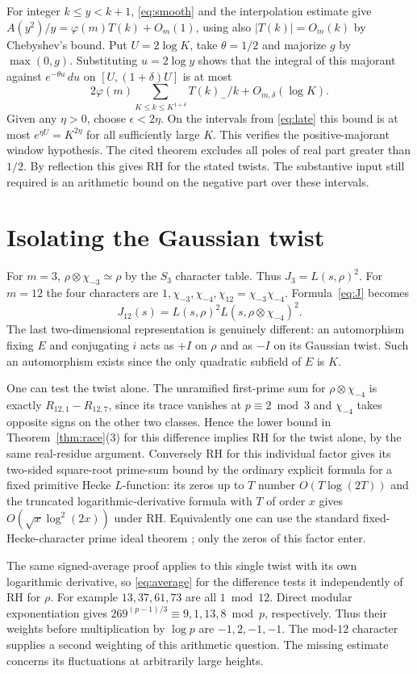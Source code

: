 \documentclass[11pt]{article}
\begin{document}
For integer $k\le y<k+1$, \eqref{eq:smooth} and the interpolation estimate give $A(y^2)/y=\varphi(m)T(k)+O_m(1)$, using also $|T(k)|=O_m(k)$ by Chebyshev's bound. Put $U=2\log K$, take $\theta=1/2$ and majorize $g$ by $\max(0,g)$. Substituting $u=2\log y$ shows that the integral of this majorant against $e^{-\theta u}\,du$ on $[U,(1+\delta)U]$ is at most
\[
 2\varphi(m)\sum_{K\le k\le K^{1+\delta}} T(k)_-/k+O_{m,\delta}(\log K).
\]
Given any $\eta>0$, choose $\epsilon<2\eta$. On the intervals from \eqref{eq:late} this bound is at most $e^{\eta U}=K^{2\eta}$ for all sufficiently large $K$. This verifies the positive-majorant window hypothesis. The cited theorem excludes all poles of real part greater than $1/2$. By reflection this gives RH for the stated twists. The substantive input still required is an arithmetic bound on the negative part over these intervals.

\section{Isolating the Gaussian twist}\label{sec:gauss}
For $m=3$, $\rho\otimes\chi_{-3}\simeq\rho$ by the $S_3$ character table. Thus $J_3=L(s,\rho)^2$. For $m=12$ the four characters are $1,\chi_{-3},\chi_{-4},\chi_{12}=\chi_{-3}\chi_{-4}$. Formula~\eqref{eq:J} becomes
\[
 J_{12}(s)=L(s,\rho)^2 L(s,\rho\otimes\chi_{-4})^2 .
\]
The last two-dimensional representation is genuinely different: an automorphism fixing $E$ and conjugating $i$ acts as $+I$ on $\rho$ and as $-I$ on its Gaussian twist. Such an automorphism exists since the only quadratic subfield of $E$ is $K$.

One can test the twist alone. The unramified first-prime sum for $\rho\otimes\chi_{-4}$ is exactly $R_{12,1}-R_{12,7}$, since its trace vanishes at $p\equiv2\bmod3$ and $\chi_{-4}$ takes opposite signs on the other two classes. Hence the lower bound in Theorem~\ref{thm:race}(3) for this difference implies RH for the twist alone, by the same real-residue argument. Conversely RH for this individual factor gives its two-sided square-root prime-sum bound by the ordinary explicit formula for a fixed primitive Hecke $L$-function: its zeros up to $T$ number $O(T\log(2T))$ and the truncated logarithmic-derivative formula with $T$ of order $x$ gives $O(\sqrt{x}\log^2(2x))$ under RH. Equivalently one can use the standard fixed-Hecke-character prime ideal theorem \cite[Ch.~5]{IK}; only the zeros of this factor enter.

The same signed-average proof applies to this single twist with its own logarithmic derivative, so \eqref{eq:average} for the difference tests it independently of RH for $\rho$. For example $13,37,61,73$ are all $1\bmod12$. Direct modular exponentiation gives $269^{(p-1)/3}\equiv9,1,13,8\bmod p$, respectively. Thus their weights before multiplication by $\log p$ are $-1,2,-1,-1$. The mod-$12$ character supplies a second weighting of this arithmetic question. The missing estimate concerns its fluctuations at arbitrarily large heights.
\end{document}
